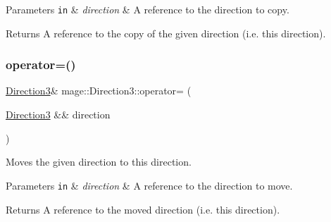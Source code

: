 \begin{DoxyParams}[1]{Parameters}
\mbox{\tt in}  & {\em direction} & A reference to the direction to copy. \\
\hline
\end{DoxyParams}
\begin{DoxyReturn}{Returns}
A reference to the copy of the given direction (i.\+e. this direction). 
\end{DoxyReturn}
\hypertarget{structmage_1_1_direction3_aac5690f3f40ba12f4e9eb09f5d2fb7f7}{}\label{structmage_1_1_direction3_aac5690f3f40ba12f4e9eb09f5d2fb7f7} 
\subsubsection{\texorpdfstring{operator=()}{operator=()}\hspace{0.1cm}{\footnotesize\ttfamily [2/2]}}
{\footnotesize\ttfamily \hyperlink{structmage_1_1_direction3}{Direction3}\& mage\+::\+Direction3\+::operator= (\begin{DoxyParamCaption}\item[{\hyperlink{structmage_1_1_direction3}{Direction3} \&\&}]{direction }\end{DoxyParamCaption})\hspace{0.3cm}{\ttfamily [default]}}

Moves the given direction to this direction.


\begin{DoxyParams}[1]{Parameters}
\mbox{\tt in}  & {\em direction} & A reference to the direction to move. \\
\hline
\end{DoxyParams}
\begin{DoxyReturn}{Returns}
A reference to the moved direction (i.\+e. this direction). 
\end{DoxyReturn}
